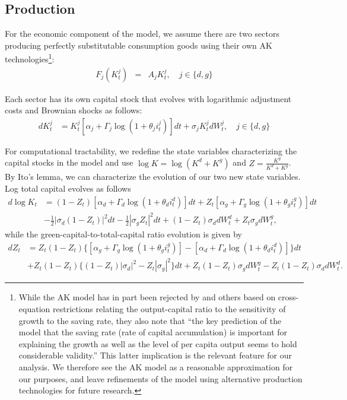 \documentclass[12pt]{article}
\begin{document}



\subsection{Production}

For the economic component of the model, we assume there are two sectors producing perfectly substitutable consumption goods using their own AK technologies\footnote{While the AK model has in part been rejected by \cite{bernanke2001growth} and others based on cross-equation restrictions relating the output-capital ratio to the sensitivity of growth to the saving rate, they also note that ``the key prediction of the model that the saving rate (rate of capital accumulation) is important for explaining the growth as well as the level of per capita output seems to hold considerable validity.'' This latter implication is the relevant feature for our analysis. We therefore see the AK model as a reasonable approximation for our purposes, and leave refinements of the model using alternative production technologies for future research.}: 
\begin{eqnarray*}
F_j(K^j_{t}) & = & A_{j} K^j_{t}, \quad j \in \{d,g\} 
\end{eqnarray*}

Each sector has its own capital stock that evolves with logarithmic adjustment costs and Brownian shocks as follows:
\begin{align*}
dK^j_{t} & = K^j_{t}[\alpha_{j}+\Gamma_j \log (1+ \theta_j i^j_{t})]dt+\sigma_{j} K^j_{t} dW^{j}_t, \quad j \in \{d,g\}
\end{align*}

For computational tractability, we redefine the state variables characterizing the capital stocks in the model and use $\log K=\log(K^{d}+K^{g})$ and $Z=\frac{K^{g}}{K^{d}+K^{g}}$. By Ito's lemma, we can characterize the evolution of our two new state variables. Log total capital evolves as follows
\begin{align*}
d\log K_t & =(1-Z_t)[\alpha_{d}+\Gamma_d \log(1+ \theta_d i^d_{t})]dt+Z_t[\alpha_{g}+\Gamma_g \log(1+ \theta_g i^g_{t})]dt\\
 & -\frac{1}{2}|\sigma_{d}(1-Z_t)|^{2}dt-\frac{1}{2}|\sigma_{g}Z_t|^{2}dt+(1-Z_t)\sigma_{d}dW^{d}_t+Z_t\sigma_{g}dW^{g}_t,
\end{align*}
while the green-capital-to-total-capital ratio evolution is given by
\begin{align*} 
dZ_t & = Z_t(1-Z_t)\{[\alpha_{g}+\Gamma_g \log(1+ \theta_g i^g_{t})]-[\alpha_{d}+\Gamma_d \log(1+ \theta_d i^d_{t})]\}dt\\
 & + Z_t(1-Z_t)\{(1-Z_t)|\sigma_{d}|^{2}-Z_t|\sigma_{g}|^{2}\}dt +Z_t(1-Z_t)\sigma_{g}dW^{g}_t-Z_t(1-Z_t)\sigma_{d}dW^{d}_t.
\end{align*}
\end{document}
